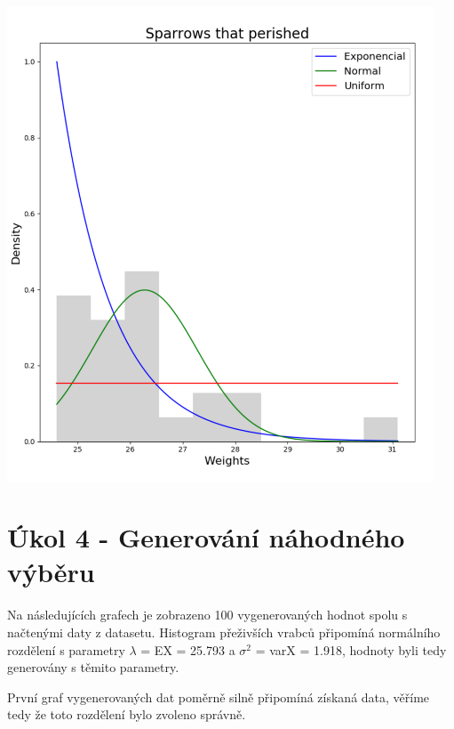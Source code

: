 \documentclass[12pt,a4paper]{article}
\begin{document}
\begin{center}
\includegraphics[width=5in]{3_died}
\end{center}
\pagebreak

\section{Úkol 4 - Generování náhodného výběru}
Na následujících grafech je zobrazeno 100 vygenerovaných hodnot spolu s načtenými daty z datasetu. Histogram přeživších vrabců připomíná normálního rozdělení s parametry $\lambda$ = EX = 25.793 a $\sigma ^2$ = varX = 1.918, hodnoty byli tedy generovány s těmito parametry. 

První graf vygenerovaných dat poměrně silně připomíná získaná data, věříme tedy že toto rozdělení bylo zvoleno správně.
\end{document}
